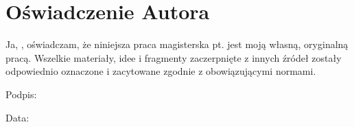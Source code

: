 
\section*{Oświadczenie Autora}

Ja, \textbf{\thesisauthor}, oświadczam, że niniejsza praca magisterska pt. \textbf{\thesistitlePL} jest moją własną, oryginalną pracą. Wszelkie materiały, idee i fragmenty zaczerpnięte z innych źródeł zostały odpowiednio oznaczone i zacytowane zgodnie z obowiązującymi normami.

\vspace*{4.0cm}

\noindent Podpis: \underline{\hspace{5cm}}

\vspace*{1.0cm}

\noindent \thesisauthor

\vspace*{0.5cm}

\noindent Data: \underline{\hspace{3cm}}

\cleardoublepage
